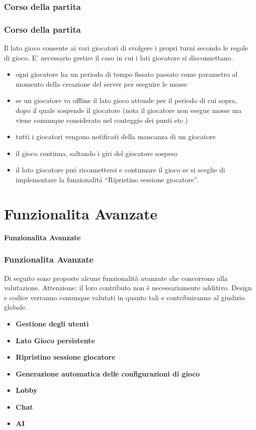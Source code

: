 \documentclass{beamer}
\begin{document}
\subsubsection{Corso della partita}
\begin{frame}
\frametitle{Corso della partita}
Il lato gioco consente ai vari giocatori di svolgere i propri turni
secondo le regole di gioco. E' necessario gestire il caso in cui i
lati giocatore si disconnettano.
\begin{itemize}
\item ogni giocatore ha un periodo di tempo fissato passato come parametro al momento della creazione del server per  eseguire le mosse 
\item se un giocatore va offline il lato gioco attende per il periodo di
  cui sopra,
  dopo il quale sospende il giocatore (nota il giocatore non esegue
  mosse ma viene comunque considerato nel conteggio dei punti etc.) 
\item tutti i giocatori vengono notificati della mancanza di un giocatore
\item il gioco continua, saltando i giri del giocatore sospeso
\item il lato giocatore pu\'o riconnettersi e continuare il gioco se si
  sceglie di implementare la funzionalit\'a ``Ripristino sessione giocatore''.
\end{itemize}
\end{frame}

\section{Funzionalita Avanzate}
\begin{frame}
\LARGE	
\textbf{Funzionalita Avanzate}

\end{frame}

\begin{frame}
\frametitle{Funzionalita Avanzate}

Di seguito sono proposte alcune funzionalit\`a avanzate che concorrono alla valutazione.  Attenzione: il loro contributo non \`e  necessariamente additivo. Design e codice verranno comunque valutati in quanto tali e contribuiranno al giudizio globale.

\begin{itemize}
\item \textbf{Gestione degli utenti}
\item  \textbf{Lato Gioco persistente}
\item  \textbf{Ripristino sessione giocatore}
\item \textbf{Generazione automatica delle configurazioni di gioco}
\item \textbf{Lobby}
\item \textbf{Chat}
\item \textbf{AI}


\end{itemize}
\end{frame}
\end{document}
